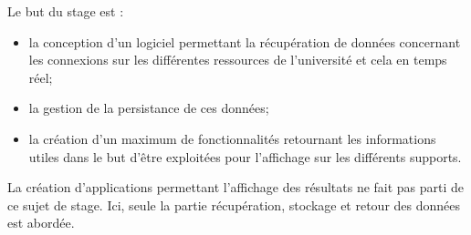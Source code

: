 \noindent Le but du stage est : 
\begin{itemize}
	\item la conception d'un logiciel permettant la r\'ecup\'eration de donn\'ees concernant les connexions sur les diff\'erentes ressources de l'universit\'e et cela en temps r\'eel;
	\item la gestion de la persistance de ces donn\'ees;
	\item la cr\'eation d'un maximum de fonctionnalit\'es retournant les informations utiles dans le but d'\^etre exploit\'ees pour l'affichage sur les diff\'erents supports.

\end{itemize} 

La cr\'eation d'applications permettant l'affichage des r\'esultats ne fait pas parti de ce sujet de stage. 
Ici, seule la partie r\'ecup\'eration, stockage et retour des donn\'ees est abord\'ee.

\clearpage
